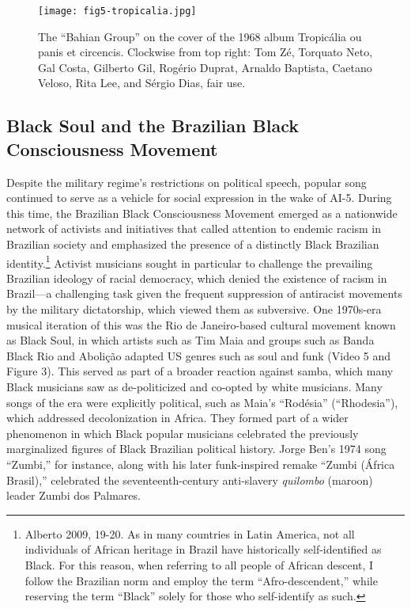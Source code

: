\documentclass[twoside]{article}
\begin{document}
\begin{figure}
  \texttt{[image: fig5-tropicalia.jpg]}
  \caption{The ``Bahian Group'' on the cover of the 1968 album Tropicália ou panis et
  circencis. Clockwise from top right: Tom Zé, Torquato Neto, Gal
  Costa, Gilberto Gil, Rogério Duprat, Arnaldo Baptista, Caetano Veloso,
  Rita Lee, and Sérgio Dias, fair use.}
\end{figure}

\hypertarget{black-soul-and-the-brazilian-black-consciousness-movement}{%
\subsection*{Black Soul and the Brazilian Black Consciousness
Movement}\label{black-soul-and-the-brazilian-black-consciousness-movement}}

Despite the military regime's restrictions on political speech, popular
song continued to serve as a vehicle for social expression in the wake
of AI-5. During this time, the Brazilian Black Consciousness Movement
emerged as a nationwide network of activists and initiatives that called
attention to endemic racism in Brazilian society and emphasized the
presence of a distinctly Black Brazilian identity.\footnote{Alberto
  2009, 19-20. As in many countries in Latin America, not all
  individuals of African heritage in Brazil have historically
  self-identified as Black. For this reason, when referring to all
  people of African descent, I follow the Brazilian norm and employ the
  term ``Afro-descendent,'' while reserving the term ``Black'' solely
  for those who self-identify as such.} Activist musicians sought in
particular to challenge the prevailing Brazilian ideology of racial
democracy, which denied the existence of racism in Brazil---a
challenging task given the frequent suppression of antiracist movements
by the military dictatorship, which viewed them as subversive. One
1970s-era musical iteration of this was the Rio de Janeiro-based
cultural movement known as Black Soul, in which artists such as Tim Maia
and groups such as Banda Black Rio and Abolição adapted US genres such
as soul and funk (Video 5 and Figure 3). This served as part of a
broader reaction against samba, which many Black musicians saw as
de-politicized and co-opted by white musicians. Many songs of the era
were explicitly political, such as Maia's ``Rodésia'' (``Rhodesia''),
which addressed decolonization in Africa. They formed part of a wider
phenomenon in which Black popular musicians celebrated the previously
marginalized figures of Black Brazilian political history. Jorge Ben's
1974 song ``Zumbi,'' for instance, along with his later funk-inspired
remake ``Zumbi (África Brasil),'' celebrated the seventeenth-century
anti-slavery \emph{quilombo} (maroon) leader Zumbi dos Palmares.
\end{document}
